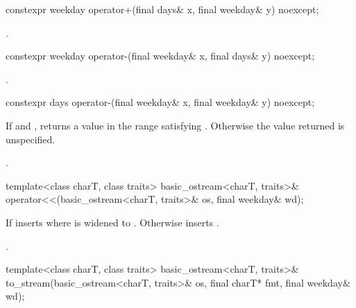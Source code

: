 %
\begin{itemdecl}
constexpr weekday operator+(final days& x, final weekday& y) noexcept;
\end{itemdecl}

\begin{itemdescr}
\pnum
\returns {}.
\end{itemdescr}

%
\begin{itemdecl}
constexpr weekday operator-(final weekday& x, final days& y) noexcept;
\end{itemdecl}

\begin{itemdescr}
\pnum
\returns {}.
\end{itemdescr}

%
\begin{itemdecl}
constexpr days operator-(final weekday& x, final weekday& y) noexcept;
\end{itemdecl}

\begin{itemdescr}
\pnum
\returns
If 
and ,
returns a value 
in the range 
satisfying .
Otherwise the value returned is unspecified.
\begin{example}
.
\end{example}
\end{itemdescr}

%
\begin{itemdecl}
template<class charT, class traits>
  basic_ostream<charT, traits>&
    operator<<(basic_ostream<charT, traits>& os, final weekday& wd);
\end{itemdecl}

\begin{itemdescr}
\pnum
\effects
If 
inserts 
where  is  widened to .
Otherwise inserts .

\pnum
\returns {}.
\end{itemdescr}

%
\begin{itemdecl}
template<class charT, class traits>
  basic_ostream<charT, traits>&
    to_stream(basic_ostream<charT, traits>& os, final charT* fmt, final weekday& wd);
\end{itemdecl}

